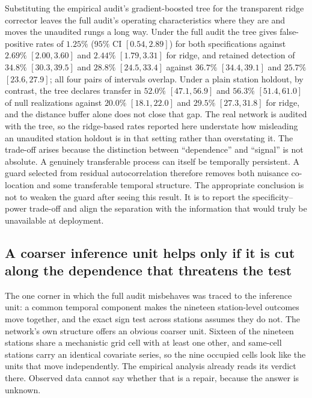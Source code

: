 Substituting the empirical audit's gradient-boosted tree for the transparent ridge corrector leaves the full audit's operating characteristics where they are and moves the unaudited rungs a long way. Under the full audit the tree gives false-positive rates of $1.25\%$ ($95\%$ CI $[0.54,2.89]$) for both specifications against $2.69\%$ $[2.00,3.60]$ and $2.44\%$ $[1.79,3.31]$ for ridge, and retained detection of $34.8\%$ $[30.3,39.5]$ and $28.8\%$ $[24.5,33.4]$ against $36.7\%$ $[34.4,39.1]$ and $25.7\%$ $[23.6,27.9]$; all four pairs of intervals overlap. Under a plain station holdout, by contrast, the tree declares transfer in $52.0\%$ $[47.1,56.9]$ and $56.3\%$ $[51.4,61.0]$ of null realizations against $20.0\%$ $[18.1,22.0]$ and $29.5\%$ $[27.3,31.8]$ for ridge, and the distance buffer alone does not close that gap. The real network is audited with the tree, so the ridge-based rates reported here understate how misleading an unaudited station holdout is in that setting rather than overstating it. The trade-off arises because the distinction between ``dependence'' and ``signal'' is not absolute. A genuinely transferable process can itself be temporally persistent. A guard selected from residual autocorrelation therefore removes both nuisance co-location and some transferable temporal structure. The appropriate conclusion is not to weaken the guard after seeing this result. It is to report the specificity--power trade-off and align the separation with the information that would truly be unavailable at deployment.



\subsection{A coarser inference unit helps only if it is cut along the dependence that threatens the test}

The one corner in which the full audit misbehaves was traced to the inference unit: a common
temporal component makes the nineteen station-level outcomes move together, and the exact sign test
across stations assumes they do not. The network's own structure offers an obvious coarser unit.
Sixteen of the nineteen stations share a mechanistic grid cell with at least one other, and
same-cell stations carry an identical covariate series, so the nine occupied cells look like the
units that move independently. The empirical analysis already reads its verdict there. Observed
data cannot say whether that is a repair, because the answer is unknown.

